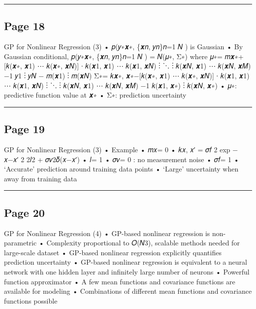 \documentclass[
]{article}
\begin{document}
\begin{center}\rule{0.5\linewidth}{0.5pt}\end{center}

\subsection{Page 18}\label{page-18}

GP for Nonlinear Regression (3) • 𝑝(𝑦∗\textbar 𝒙∗, \{𝒙𝑛, 𝑦𝑛\}𝑛=1 𝑁 ) is
Gaussian • By Gaussian conditional, 𝑝(𝑦∗\textbar 𝒙∗, \{𝒙𝑛, 𝑦𝑛\}𝑛=1 𝑁 ) =
𝑁(𝜇∗, Σ∗) where 𝜇∗= 𝑚𝒙∗+ {[}𝑘(𝒙∗, 𝒙1) ⋯ 𝑘(𝒙∗, 𝒙𝑁){]} ∙ 𝑘(𝒙1, 𝒙1) ⋯ 𝑘(𝒙1,
𝒙𝑁) ⋮ ⋱ ⋮ 𝑘(𝒙𝑁, 𝒙1) ⋯ 𝑘(𝒙𝑁, 𝒙𝑀) −1 𝑦1 ⋮ 𝑦𝑁 − 𝑚(𝒙1) ⋮ 𝑚(𝒙𝑁) Σ∗= 𝑘𝒙∗,
𝒙∗−{[}𝑘(𝒙∗, 𝒙1) ⋯ 𝑘(𝒙∗, 𝒙𝑁){]} ∙ 𝑘(𝒙1, 𝒙1) ⋯ 𝑘(𝒙1, 𝒙𝑁) ⋮ ⋱ ⋮ 𝑘(𝒙𝑁, 𝒙1) ⋯
𝑘(𝒙𝑁, 𝒙𝑀) −1 𝑘(𝒙1, 𝒙∗) ⋮ 𝑘(𝒙𝑁, 𝒙∗) • 𝜇∗: predictive function value at 𝒙∗
• Σ∗: prediction uncertainty

\begin{center}\rule{0.5\linewidth}{0.5pt}\end{center}

\subsection{Page 19}\label{page-19}

GP for Nonlinear Regression (3) • Example • 𝑚𝑥= 0 • 𝑘𝑥, 𝑥′ = 𝜎𝑓 2 exp −
𝑥−𝑥′ 2 2𝑙2 + 𝜎𝑣2𝛿(𝑥−𝑥′) • 𝑙= 1 • 𝜎𝑣= 0 : no measurement noise • 𝜎𝑓= 1 •
`Accurate' prediction around training data points • `Large' uncertainty
when away from training data

\begin{center}\rule{0.5\linewidth}{0.5pt}\end{center}

\subsection{Page 20}\label{page-20}

GP for Nonlinear Regression (4) • GP-based nonlinear regression is
non-parametric • Complexity proportional to 𝑂(𝑁3), scalable methods
needed for large-scale dataset • GP-based nonlinear regression
explicitly quantifies prediction uncertainty • GP-based nonlinear
regression is equivalent to a neural network with one hidden layer and
infinitely large number of neurons • Powerful function approximator • A
few mean functions and covariance functions are available for modeling •
Combinations of different mean functions and covariance functions
possible
\end{document}
